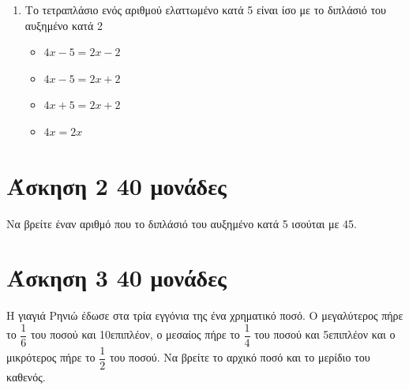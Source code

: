 \documentclass[a4paper,10pt]{report}
\begin{document}
\begin{enumerate}[1)]
\begin{multicols}{4}
\begin{itemize}
 \item $3x-3=2x+1$
\end{itemize}
\end{multicols}
\item Το τετραπλάσιο ενός αριθμού ελαττωμένο κατά 5 είναι ίσο με το διπλάσιό του αυξημένο κατά 2 %
\begin{multicols}{4}
\begin{itemize}
 \item $4x-5=2x-2$
 \item $4x-5=2x+2$
 \item $4x+5=2x+2$
 \item $4x=2x$
\end{itemize}
\end{multicols}
\end{enumerate}


\section*{Άσκηση 2  \hfill \small{40 μονάδες}}
Να βρείτε έναν αριθμό που το διπλάσιό του αυξημένο κατά 5 ισούται με 45.

\section*{Άσκηση 3  \hfill \small{40 μονάδες}}
Η γιαγιά Ρηνιώ έδωσε στα τρία εγγόνια της ένα χρηματικό ποσό. Ο μεγαλύτερος πήρε το $\dfrac{1}{6}$ του ποσού 
και 10\texteuro \quad επιπλέον,  ο μεσαίος πήρε το $\dfrac{1}{4}$ του ποσού και 5\texteuro \quad επιπλέον και ο 
μικρότερος πήρε το $\dfrac{1}{2}$ του ποσού. Να βρείτε το αρχικό ποσό και το μερίδιο του καθενός.
\end{document}
